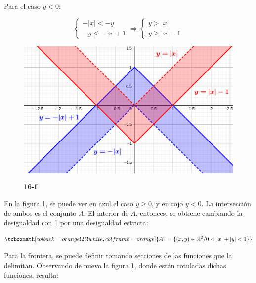 \documentclass{article}
\renewcommand{\Bbb}{\mathbb}
\begin{document}
\begin{enumerate}[(a)]
Para el caso $y < 0$:

\begin{equation}
\left\{
\begin{array}{ll}
-|x| < -y \\
-y \leq -|x| + 1
\end{array}
\right. \Rightarrow
\left\{
\begin{array}{ll}
y > |x| \\
y \geq |x| - 1
\end{array}
\right.
\end{equation}

\begin{figure}[ht]
\caption{\textbf{16-f}}
\includegraphics[scale=2.5]{img/ejercicios/1/16-f.png} 
\centering
\label{fig:1-16-f}
\end{figure}

En la figura \ref{fig:1-16-f}, se puede ver en azul el caso $y \geq 0$, y en rojo $y < 0$. La intersección de ambos es el conjunto $A$. El interior de $A$, entonces, se obtiene cambiando la desigualdad con 1 por una desigualdad estricta:

\begin{equation}
\tcboxmath[colback=orange!25!white,colframe=orange]
{ A^{\circ} = \{ (x,y) \in \Bbb R^2 / 0 < |x| + |y| < 1 \} }
\end{equation}

Para la frontera, se puede definir tomando secciones de las funciones que la delimitan. Observando de nuevo la figura \ref{fig:1-16-f}, donde están rotuladas dichas funciones, resulta:


\end{enumerate}
\end{document}
